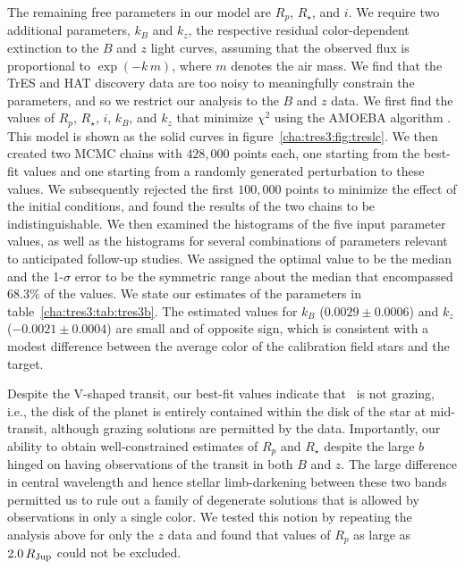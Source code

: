 The remaining free parameters in our model are $R_p$, $R_{\star}$, and $i$. 
We require two additional parameters, $k_B$ and $k_z$, the respective residual color-dependent extinction to the $B$ and $z$ light curves, assuming that the observed flux is proportional to $\exp{(-k\, m)}$, where $m$ denotes the air mass. 
We find that the TrES and HAT discovery data are too noisy to meaningfully constrain the parameters, and so we restrict our analysis to the $B$ and $z$ data. 
We first find the values of $R_p$, $R_{\star}$, $i$, $k_B$, and $k_z$ that minimize ${\chi}^2$ using the AMOEBA algorithm \citep[][]{Press_Teukolsky_Vetterling:1992a}.
This model is shown as the solid curves in figure~\ref{cha:tres3:fig:treslc}. 
We then created two MCMC chains with $428,\!000$ points each, one starting from the best-fit values and one starting from a randomly generated perturbation to these values. 
We subsequently rejected the first $100,\!000$ points to minimize the effect of the initial conditions, and found the results of the two chains to be indistinguishable.
We then examined the histograms of the five input parameter values, as well as the histograms for several combinations of parameters relevant to anticipated follow-up studies. 
We assigned the optimal value to be the median and the 1-$\sigma$ error to be the symmetric range about the median that encompassed 68.3\% of the values. 
We state our estimates of the parameters in table~\ref{cha:tres3:tab:tres3b}.
The estimated values for $k_B$ ($0.0029 \pm 0.0006$) and $k_z$ ($-0.0021 \pm 0.0004$) are small and of opposite sign, which is consistent with a modest difference between the average color of the calibration field stars and the target.

Despite the V-shaped transit, our best-fit values indicate that  \tresThree\ is not grazing, i.e., the disk of the planet is entirely contained within the disk of the star at mid-transit, although grazing solutions are permitted by the data. 
Importantly, our ability to obtain well-constrained estimates of $R_{p}$ and $R_{\star}$ despite the large $b$ hinged on having observations of the transit in both $B$ and $z$. 
The large difference in central wavelength and hence stellar limb-darkening between these two bands permitted us to rule out a family of degenerate solutions that is allowed by observations in only a single color. 
We tested this notion by repeating the analysis above for only the $z$ data and found that values of $R_p$ as large as $2.0\,R_{\rm Jup}$ could not be excluded.

